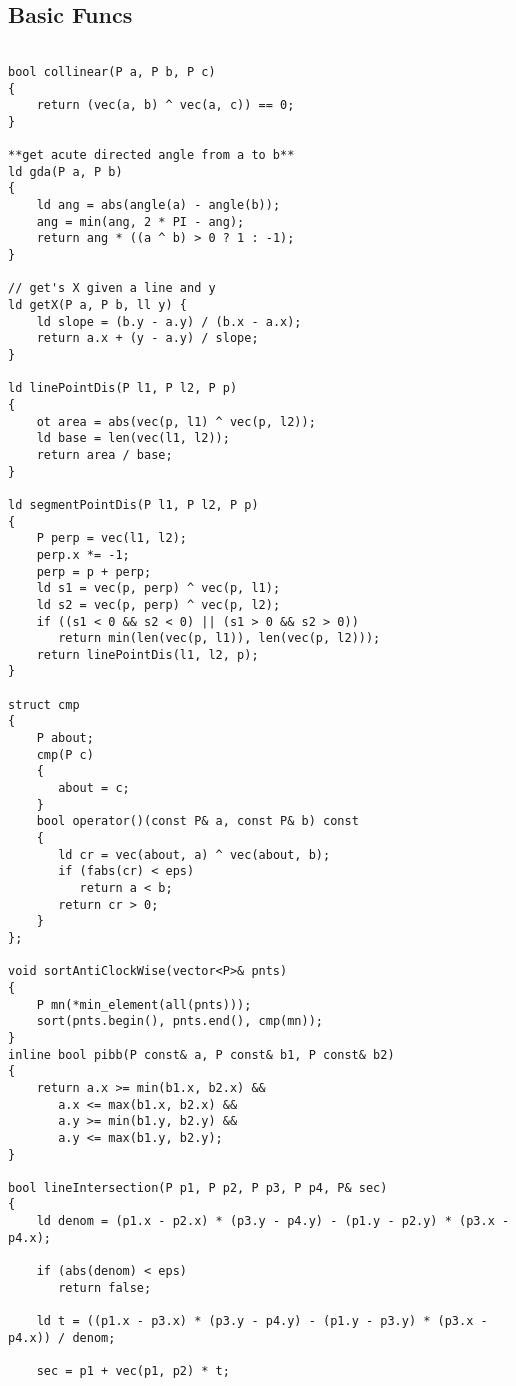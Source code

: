 \documentclass{article}
\begin{document}
\subsection{Basic Funcs}
\begin{verbatim}

bool collinear(P a, P b, P c)  
{  
    return (vec(a, b) ^ vec(a, c)) == 0;  
}

**get acute directed angle from a to b**  
ld gda(P a, P b)  
{  
    ld ang = abs(angle(a) - angle(b));  
    ang = min(ang, 2 * PI - ang);  
    return ang * ((a ^ b) > 0 ? 1 : -1);  
}

// get's X given a line and y
ld getX(P a, P b, ll y) {  
    ld slope = (b.y - a.y) / (b.x - a.x);  
    return a.x + (y - a.y) / slope;  
}

ld linePointDis(P l1, P l2, P p)  
{  
    ot area = abs(vec(p, l1) ^ vec(p, l2));  
    ld base = len(vec(l1, l2));  
    return area / base;  
}  

ld segmentPointDis(P l1, P l2, P p)  
{  
    P perp = vec(l1, l2);  
    perp.x *= -1;  
    perp = p + perp;  
    ld s1 = vec(p, perp) ^ vec(p, l1);  
    ld s2 = vec(p, perp) ^ vec(p, l2);  
    if ((s1 < 0 && s2 < 0) || (s1 > 0 && s2 > 0))  
       return min(len(vec(p, l1)), len(vec(p, l2)));  
    return linePointDis(l1, l2, p);  
}  

struct cmp  
{  
    P about;  
    cmp(P c)  
    {  
       about = c;  
    }  
    bool operator()(const P& a, const P& b) const  
    {  
       ld cr = vec(about, a) ^ vec(about, b);  
       if (fabs(cr) < eps)  
          return a < b;  
       return cr > 0;  
    }  
};  

void sortAntiClockWise(vector<P>& pnts)  
{  
    P mn(*min_element(all(pnts)));  
    sort(pnts.begin(), pnts.end(), cmp(mn));  
}  
inline bool pibb(P const& a, P const& b1, P const& b2)  
{  
    return a.x >= min(b1.x, b2.x) &&  
       a.x <= max(b1.x, b2.x) &&  
       a.y >= min(b1.y, b2.y) &&  
       a.y <= max(b1.y, b2.y);  
}  

bool lineIntersection(P p1, P p2, P p3, P p4, P& sec)  
{  
    ld denom = (p1.x - p2.x) * (p3.y - p4.y) - (p1.y - p2.y) * (p3.x -p4.x);  
  
    if (abs(denom) < eps)  
       return false;  
  
    ld t = ((p1.x - p3.x) * (p3.y - p4.y) - (p1.y - p3.y) * (p3.x - p4.x)) / denom;  
  
    sec = p1 + vec(p1, p2) * t;  
  

\end{verbatim}
\end{document}
